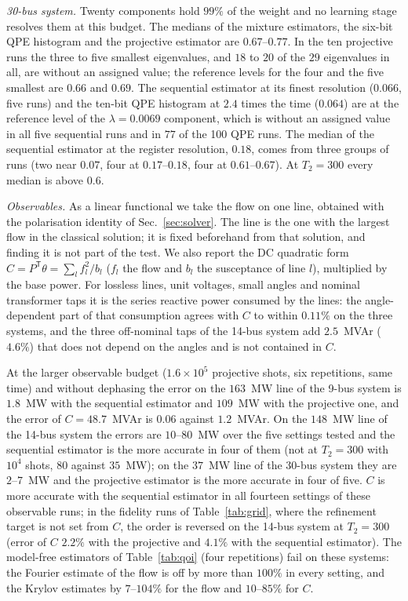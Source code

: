 \documentclass[journal]{IEEEtran}
\begin{document}
\emph{30-bus system.} Twenty components hold $99\%$ of the weight and no learning stage resolves them at this budget. The medians of the mixture estimators, the six-bit QPE histogram and the projective estimator are $0.67$--$0.77$. In the ten projective runs the three to five smallest eigenvalues, and $18$ to $20$ of the $29$ eigenvalues in all, are without an assigned value; the reference levels for the four and the five smallest are $0.66$ and $0.69$. The sequential estimator at its finest resolution ($0.066$, five runs) and the ten-bit QPE histogram at $2.4$ times the time ($0.064$) are at the reference level of the $\lambda=0.0069$ component, which is without an assigned value in all five sequential runs and in $77$ of the 100 QPE runs. The median of the sequential estimator at the register resolution, $0.18$, comes from three groups of runs (two near $0.07$, four at $0.17$--$0.18$, four at $0.61$--$0.67$). At $T_2=300$ every median is above $0.6$.

\emph{Observables.} As a linear functional we take the flow on one line, obtained with the polarisation identity of Sec.~\ref{sec:solver}. The line is the one with the largest flow in the classical solution; it is fixed beforehand from that solution, and finding it is not part of the test. We also report the DC quadratic form $C=P^{\mathsf T}\theta=\sum_lf_l^2/b_l$ ($f_l$ the flow and $b_l$ the susceptance of line $l$), multiplied by the base power. For lossless lines, unit voltages, small angles and nominal transformer taps it is the series reactive power consumed by the lines: the angle-dependent part of that consumption agrees with $C$ to within $0.11\%$ on the three systems, and the three off-nominal taps of the 14-bus system add $2.5$~MVAr ($4.6\%$) that does not depend on the angles and is not contained in $C$.

At the larger observable budget ($1.6\times10^5$ projective shots, six repetitions, same time) and without dephasing the error on the $163$~MW line of the 9-bus system is $1.8$~MW with the sequential estimator and $109$~MW with the projective one, and the error of $C=48.7$~MVAr is $0.06$ against $1.2$~MVAr. On the $148$~MW line of the 14-bus system the errors are $10$--$80$~MW over the five settings tested and the sequential estimator is the more accurate in four of them (not at $T_2=300$ with $10^4$ shots, $80$ against $35$~MW); on the $37$~MW line of the 30-bus system they are $2$--$7$~MW and the projective estimator is the more accurate in four of five. $C$ is more accurate with the sequential estimator in all fourteen settings of these observable runs; in the fidelity runs of Table~\ref{tab:grid}, where the refinement target is not set from $C$, the order is reversed on the 14-bus system at $T_2=300$ (error of $C$ $2.2\%$ with the projective and $4.1\%$ with the sequential estimator). The model-free estimators of Table~\ref{tab:qoi} (four repetitions) fail on these systems: the Fourier estimate of the flow is off by more than $100\%$ in every setting, and the Krylov estimates by $7$--$104\%$ for the flow and $10$--$85\%$ for $C$.
\end{document}

